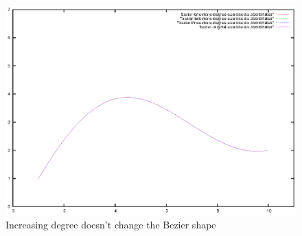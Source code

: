 \documentclass{article}
\begin{document}
\begin{figure}
  \centering
  \includegraphics{bezier-deCasteljau-curves/exercise-six-one-more-degree-comparison}
  \caption{Increasing degree doesn't change the Bezier shape}
  \label{fig:increasing-degree-does-change-curve}
\end{figure}
\end{document}
